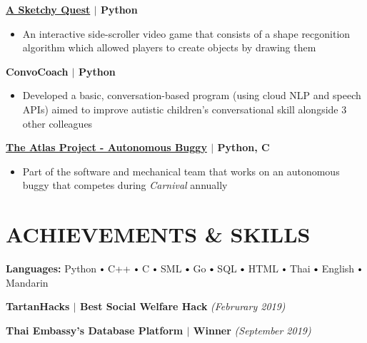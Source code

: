 \documentclass[10pt]{article}
\newcommand\sbullet[1][.5]{\mathbin{\vcenter{\hbox{\scalebox{#1}{$\bullet$}}}}}
\newcommand{\CC}{C\nolinebreak\hspace{-.05em}\raisebox{.4ex}{\tiny\bf +}\nolinebreak\hspace{-.10em}\raisebox{.4ex}{\tiny\bf +}}
\begin{document}
  \textbf{\large \href{https://github.com/Piratach/A-Sketchy-Quest}{A Sketchy Quest} $\mid$ Python} 
  \vspace*{-0.17cm}
  \begin{itemize}
    \itemsep-0.4em
    \item \textcolor{lighterG}{An interactive side-scroller video game that consists of a shape recgonition algorithm which allowed players to create objects by drawing them}
  \end{itemize}

  \textbf{\large ConvoCoach $\mid$ Python} 
  \vspace*{-0.17cm}
  \begin{itemize}
    \itemsep-0.4em
    \item \textcolor{lighterG}{Developed a basic, conversation-based program (using cloud NLP and speech APIs) aimed to improve autistic children's conversational skill alongside 3 other colleagues}
  \end{itemize}

  \textbf{\large \href{https://sites.google.com/view/atlasbuggy/}{The Atlas Project - Autonomous Buggy} $\mid$ Python, \CC} 
  \vspace*{-0.17cm}
  \begin{itemize}
    \itemsep0em
    \item \textcolor{lighterG}{Part of the software and mechanical team that works on an autonomous buggy that competes during \textit{Carnival} annually}
  \end{itemize}


  \section*{\large \textcolor{lighterB}{ACHIEVEMENTS \& SKILLS}}
  \vspace*{-0.3cm}

    \textbf{Languages:}
    Python $\sbullet[.75]$ 
    C++ $\sbullet[.75]$
    C $\sbullet[.75]$ 
    SML $\sbullet[.75]$ 
    Go $\sbullet[.75]$ 
    SQL $\sbullet[.75]$ 
    HTML $\sbullet[.75]$ 
    Thai $\sbullet[.75]$ 
    English $\sbullet[.75]$ 
    Mandarin

    \vspace{0.1cm}

    \textbf{TartanHacks $\mid$ Best Social Welfare Hack} \hfill \textit{(Februrary 2019)}

    \textbf{Thai Embassy's Database Platform $\mid$ Winner} \hfill \textit{(September 2019)}
\end{document}
